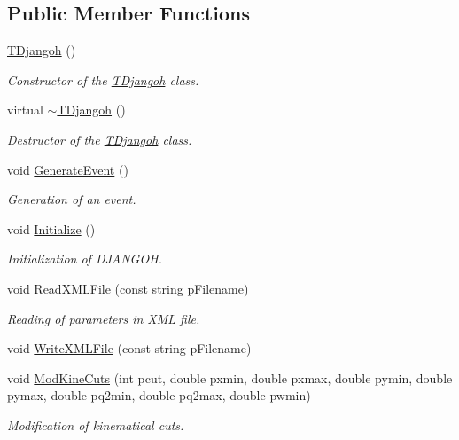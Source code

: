 \subsection*{Public Member Functions}
\begin{DoxyCompactItemize}
\item 
\hyperlink{class_t_djangoh_a7cbbb76ddc4fe82e25bb1e58078e45bc}{T\+Djangoh} ()
\begin{DoxyCompactList}\small\item\em Constructor of the \hyperlink{class_t_djangoh}{T\+Djangoh} class. \end{DoxyCompactList}\item 
virtual \hyperlink{class_t_djangoh_abee806f1e4536b30624590e34869f0e0}{$\sim$\+T\+Djangoh} ()
\begin{DoxyCompactList}\small\item\em Destructor of the \hyperlink{class_t_djangoh}{T\+Djangoh} class. \end{DoxyCompactList}\item 
void \hyperlink{class_t_djangoh_a121effe35c3f3ac168a4663bcd5eef5c}{Generate\+Event} ()
\begin{DoxyCompactList}\small\item\em Generation of an event. \end{DoxyCompactList}\item 
void \hyperlink{class_t_djangoh_a763cae78834404166df26ccd059bb301}{Initialize} ()
\begin{DoxyCompactList}\small\item\em Initialization of D\+J\+A\+N\+G\+OH. \end{DoxyCompactList}\item 
void \hyperlink{class_t_djangoh_af6954bed103bc5adc60822f16268c12d}{Read\+X\+M\+L\+File} (const string p\+Filename)
\begin{DoxyCompactList}\small\item\em Reading of parameters in X\+ML file. \end{DoxyCompactList}\item 
void \hyperlink{class_t_djangoh_ade135fa317b5678c048d417fcef573ae}{Write\+X\+M\+L\+File} (const string p\+Filename)
\item 
void \hyperlink{class_t_djangoh_a20fbc4c9736f639e6211333c6113421a}{Mod\+Kine\+Cuts} (int pcut, double pxmin, double pxmax, double pymin, double pymax, double pq2min, double pq2max, double pwmin)
\begin{DoxyCompactList}\small\item\em Modification of kinematical cuts. \end{DoxyCompactList}\item 

\end{DoxyCompactItemize}
